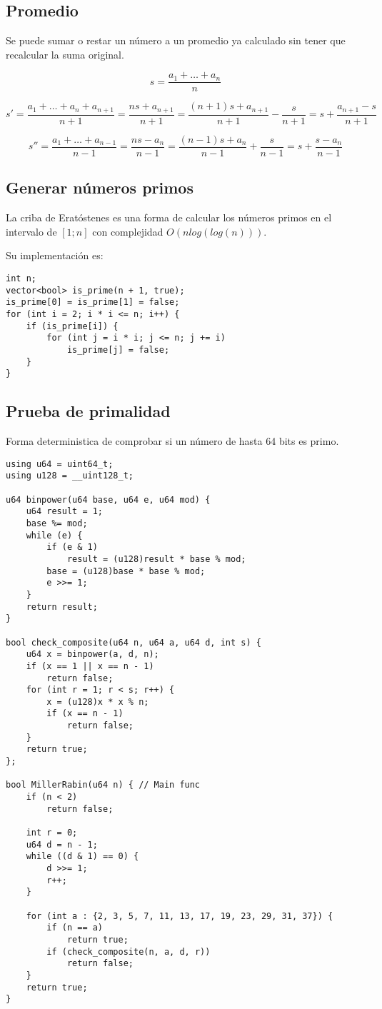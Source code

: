 \documentclass[10pt]{article}
\begin{document}
\subsection{Promedio}

Se puede sumar o restar un número a un promedio ya calculado sin tener que recalcular la suma original.

\[ s = \frac{a_1 + \dots + a_n}{n} \]

\[ s' = \frac{a_1 + \dots + a_n + a_{n + 1}}{n + 1} = \frac{ns + a_{n + 1}}{n + 1} = \frac{(n + 1)s + a_{n + 1}}{n + 1} - \frac{s}{n + 1} = s + \frac{a_{n + 1} - s}{n + 1} \]

\[ s'' = \frac{a_1 + \dots + a_{n - 1}}{n - 1} = \frac{ns - a_{n}}{n - 1} = \frac{(n - 1)s + a_{n}}{n - 1} + \frac{s}{n - 1} = s + \frac{s - a_{n}}{n - 1} \]

\subsection{Generar números primos}

La criba de Eratóstenes es una forma de calcular los números primos en el intervalo de $[1 ; n]$ con complejidad $O(nlog(log(n)))$.

Su implementación es:

\begin{lstlisting}
int n;
vector<bool> is_prime(n + 1, true);
is_prime[0] = is_prime[1] = false;
for (int i = 2; i * i <= n; i++) {
    if (is_prime[i]) {
        for (int j = i * i; j <= n; j += i)
            is_prime[j] = false;
    }
}
\end{lstlisting}

\subsection{Prueba de primalidad}

Forma deterministica de comprobar si un número de hasta 64 bits es primo. 

\begin{lstlisting}
using u64 = uint64_t;
using u128 = __uint128_t;

u64 binpower(u64 base, u64 e, u64 mod) {
    u64 result = 1;
    base %= mod;
    while (e) {
        if (e & 1)
            result = (u128)result * base % mod;
        base = (u128)base * base % mod;
        e >>= 1;
    }
    return result;
}

bool check_composite(u64 n, u64 a, u64 d, int s) {
    u64 x = binpower(a, d, n);
    if (x == 1 || x == n - 1)
        return false;
    for (int r = 1; r < s; r++) {
        x = (u128)x * x % n;
        if (x == n - 1)
            return false;
    }
    return true;
};

bool MillerRabin(u64 n) { // Main func
    if (n < 2)
        return false;

    int r = 0;
    u64 d = n - 1;
    while ((d & 1) == 0) {
        d >>= 1;
        r++;
    }

    for (int a : {2, 3, 5, 7, 11, 13, 17, 19, 23, 29, 31, 37}) {
        if (n == a)
            return true;
        if (check_composite(n, a, d, r))
            return false;
    }
    return true;
}
\end{lstlisting}
\end{document}
